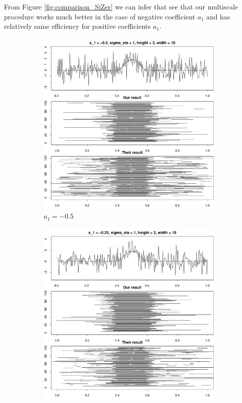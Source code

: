 \documentclass[a4paper,12pt]{article}
\begin{document}
From Figure \ref{fig:comparison_SiZer} we can infer that see that our multiscale procedure works much better in the case of negative coefficient $a_1$ and has relatively same efficiency for positive coefficients $a_1$.

\begin{figure}
\begin{subfigure}{.5\textwidth}
  \centering
  \includegraphics[width=.9\linewidth]{Plots/min_int_with_T_250_a1_-05_height_2_width_10.pdf}
  \caption{$a_1 = -0.5$}
  \label{fig:sfig1}
\end{subfigure}%
\begin{subfigure}{.5\textwidth}
  \centering
  \includegraphics[width=.9\linewidth]{Plots/min_int_with_T_250_a1_-025_height_2_width_10.pdf}

\end{subfigure}
\end{figure}
\end{document}

